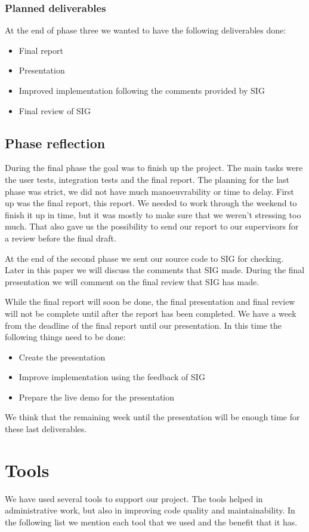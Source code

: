\subsubsection{Planned deliverables}
At the end of phase three we wanted to have the following deliverables done:
\begin{itemize}
\item Final report
\item Presentation
\item Improved implementation following the comments provided by SIG
\item Final review of SIG
\end{itemize}

\subsection{Phase reflection}
During the final phase the goal was to finish up the project.
The main tasks were the user tests, integration tests and the final report.
The planning for the last phase was strict, we did not have much manoeuvrability or time to delay.
First up was the final report, this report.
We needed to work through the weekend to finish it up in time, but it was mostly to make sure that we weren't stressing too much.
That also gave us the possibility to send our report to our supervisors for a review before the final draft.

At the end of the second phase we sent our source code to SIG for checking.
Later in this paper we will discuss the comments that SIG made.
During the final presentation we will comment on the final review that SIG has made.

While the final report will soon be done, the final presentation and final review will not be complete until after the report has been completed.
We have a week from the deadline of the final report until our presentation.
In this time the following things need to be done:
\begin{itemize}
\item Create the presentation
\item Improve implementation using the feedback of SIG
\item Prepare the live demo for the presentation
\end{itemize}
We think that the remaining week until the presentation will be enough time for these last deliverables.

\section{Tools}
We have used several tools to support our project.
The tools helped in administrative work, but also in improving code quality and maintainability.
In the following list we mention each tool that we used and the benefit that it has.

